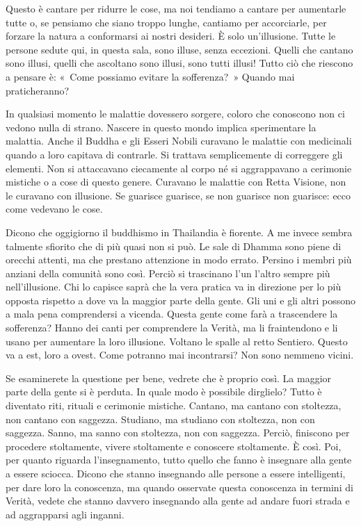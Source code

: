 Questo è cantare per ridurre le cose, ma noi tendiamo a cantare per
aumentarle tutte o, se pensiamo che siano troppo lunghe, cantiamo per
accorciarle, per forzare la natura a conformarsi ai nostri desideri. È
solo un'illusione. Tutte le persone sedute qui, in questa sala, sono
illuse, senza eccezioni. Quelli che cantano sono illusi, quelli che
ascoltano sono illusi, sono tutti illusi! Tutto ciò che riescono a
pensare è: «~Come possiamo evitare la sofferenza?~» Quando mai
praticheranno?

In qualsiasi momento le malattie dovessero sorgere, coloro che conoscono
non ci vedono nulla di strano. Nascere in questo mondo implica
sperimentare la malattia. Anche il Buddha e gli Esseri Nobili curavano
le malattie con medicinali quando a loro capitava di contrarle. Si
trattava semplicemente di correggere gli elementi. Non si attaccavano
ciecamente al corpo né si aggrappavano a cerimonie mistiche o a cose di
questo genere. Curavano le malattie con Retta Visione, non le curavano
con illusione. Se guarisce guarisce, se non guarisce non guarisce: ecco
come vedevano le cose.

Dicono che oggigiorno il buddhismo in Thailandia è fiorente. A me invece
sembra talmente sfiorito che di più quasi non si può. Le sale di Dhamma
sono piene di orecchi attenti, ma che prestano attenzione in modo
errato. Persino i membri più anziani della comunità sono così. Perciò si
trascinano l'un l'altro sempre più nell'illusione. Chi lo capisce saprà
che la vera pratica va in direzione per lo più opposta rispetto a dove
va la maggior parte della gente. Gli uni e gli altri possono a mala pena
comprendersi a vicenda. Questa gente come farà a trascendere la
sofferenza? Hanno dei canti per comprendere la Verità, ma li
fraintendono e li usano per aumentare la loro illusione. Voltano le
spalle al retto Sentiero. Questo va a est, loro a ovest. Come potranno
mai incontrarsi? Non sono nemmeno vicini.

Se esaminerete la questione per bene, vedrete che è proprio così. La
maggior parte della gente si è perduta. In quale modo è possibile
dirglielo? Tutto è diventato riti, rituali e cerimonie mistiche.
Cantano, ma cantano con stoltezza, non cantano con saggezza. Studiano,
ma studiano con stoltezza, non con saggezza. Sanno, ma sanno con
stoltezza, non con saggezza. Perciò, finiscono per procedere
stoltamente, vivere stoltamente e conoscere stoltamente. È così. Poi,
per quanto riguarda l'insegnamento, tutto quello che fanno è insegnare
alla gente a essere sciocca. Dicono che stanno insegnando alle persone a
essere intelligenti, per dare loro la conoscenza, ma quando osservate
questa conoscenza in termini di Verità, vedete che stanno davvero
insegnando alla gente ad andare fuori strada e ad aggrapparsi agli
inganni.

